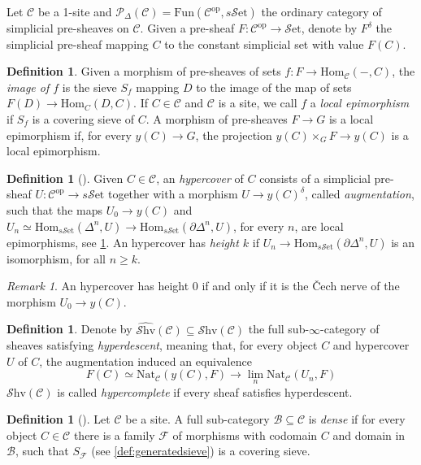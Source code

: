 \documentclass[10pt]{amsart}
\newcommand{\B}{\mathscr{B}}
\newcommand{\C}{\mathscr{C}}
\newcommand{\F}{\mathscr{F}}
\newcommand{\rP}{\mathscr{P}}
\newcommand{\Hom}{\mathrm{Hom}}
\newcommand{\set}{\mathscr{S}\mathrm{et}}
\newcommand{\sset}{s\mathscr{S}\mathrm{et}}
\newcommand{\Fun}{\mathrm{Fun}}
\newcommand{\Nat}{\mathrm{Nat}}
\newcommand{\Shv}{\mathscr{S}\mathrm{hv}}
\newcommand{\op}{\mathrm{op}}
\theoremstyle{definition}
\newtheorem{definition}[equation]{Definition}
\theoremstyle{remark}
\newtheorem{remark}[equation]{Remark}
\numberwithin{equation}{section}
\begin{document}
Let $\C$ be a 1-site and $\rP_\Delta(\C)=\Fun(\C^{\op},\sset)$ the ordinary category of simplicial pre-sheaves on $\C$. Given a pre-sheaf $F:\C^{\op}\to\set$, denote by $F^\delta$ the simplicial pre-sheaf mapping $C$ to the constant simplicial set with value $F(C)$. 
\begin{definition}\label{def:locepi}
	Given a morphism of pre-sheaves of sets $f:F\to\Hom_\C(-,C)$, the \emph{image of $f$} is the sieve $S_f$  mapping $D$ to the image of the map of sets $F(D)\to\Hom_C(D,C)$. If $C\in\C$ and $\C$ is a site, we call $f$ a \emph{local epimorphism} if $S_f$ is a covering sieve of $C$. A morphism of pre-sheaves $F\to G$ is a local epimorphism if, for every $y(C)\to G$, the projection $y(C)\times_GF\to y(C)$ is a local epimorphism. 
\end{definition}
\begin{definition}[{\cite[Lemma 4.9]{dugger2003hypercoverssimplicialpresheaves}}]
	Given $C\in\C$, an \emph{hypercover} of $C$ consists of a simplicial pre-sheaf $U:\C^{\op}\to\sset$ together with a morphism $U\to y(C)^\delta$, called \emph{augmentation}, such that the maps $U_0\to y(C)$ and $U_n\simeq \Hom_{\sset}({\Delta^n},U)\to\Hom_{\sset}({\partial\Delta^n},U)$, for every $n$, are local epimorphisms, see \cref{def:locepi}. An hypercover has \emph{height $k$} if $U_n\to\Hom_{\sset}(\partial\Delta^n,U)$ is an isomorphism, for all $n\geq k$. 
\end{definition}
\begin{remark}\label{rmk:cech}
	An hypercover has height 0 if and only if it is the \v Cech nerve of the morphism $U_0\to y(C)$. 
\end{remark}
\begin{definition}
	Denote by $\widehat{\Shv}(\C)\subseteq\Shv(\C)$ the full sub-$\infty$-category of sheaves satisfying \emph{hyperdescent}, meaning that, for every object $C$ and hypercover $U$ of $C$, the augmentation induced an equivalence 
	$$F(C)\simeq\Nat_\C(y(C),F)\to\lim_n\Nat_\C(U_n,F)$$ $\Shv(\C)$ is called \emph{hypercomplete} if every sheaf satisfies hyperdescent. 
\end{definition}
\begin{definition}[{\cite[Definition 3.12.2]{barwick2020exodromy}}]\label{def:dense}
	Let $\C$ be a site. A full sub-category $\B\subseteq\C$ is \emph{dense} if for every object $C\in\C$ there is a family $\F$ of morphisms with codomain $C$ and domain in $\B$, such that $S_\F$ (see \cref{def:generatedsieve}) is a covering sieve. 
\end{definition}
\end{document}
